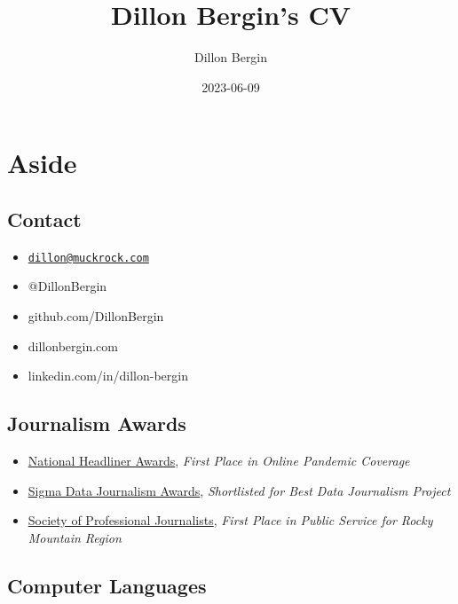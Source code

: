 \documentclass[
]{article}
\title{Dillon Bergin's CV}
\author{Dillon Bergin}
\date{2023-06-09}
\providecommand{\tightlist}{%
  \setlength{\itemsep}{0pt}\setlength{\parskip}{0pt}}
\begin{document}
\maketitle

\hypertarget{aside}{%
\section{Aside}\label{aside}}

\hypertarget{contact}{%
\subsection{Contact}\label{contact}}

\begin{itemize}
\tightlist
\item
  \href{mailto:dillon@muckrock.com}{\nolinkurl{dillon@muckrock.com}}
\item
  @DillonBergin
\item
  github.com/DillonBergin
\item
  dillonbergin.com
\item
  linkedin.com/in/dillon-bergin
\end{itemize}

\hypertarget{awards}{%
\subsection{Journalism Awards}\label{awards}}

\begin{itemize}
\item
  \href{https://www.muckrock.com/news/archives/2022/may/02/muckrock-wins-headliners/}{National
  Headliner Awards}, \emph{First Place in Online Pandemic Coverage}
\item
  \href{https://brown.columbia.edu/uncounted-shortlisted-for-best-data-project-by-the-sigma-awards/}{Sigma
  Data Journalism Awards}, \emph{Shortlisted for Best Data Journalism
  Project}
\item
  \href{https://twitter.com/SearchlightNM/status/1513993070735335425}{Society
  of Professional Journalists}, \emph{First Place in Public Service for
  Rocky Mountain Region}
\end{itemize}

\hypertarget{skills1}{%
\subsection{Computer Languages}\label{skills1}}
\end{document}
